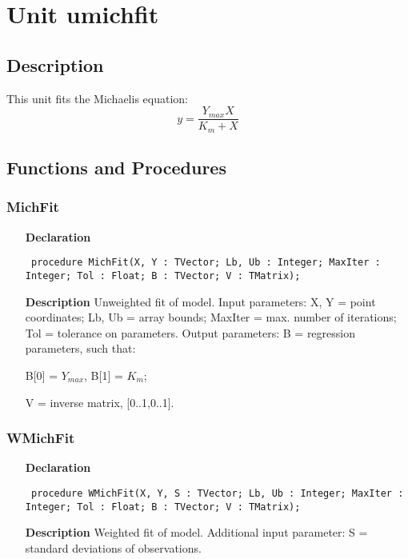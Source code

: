 \documentclass[12pt,a4paper,oneside]{report}
\newcommand{\declarationitem}[1]{\textbf{#1}}
\newcommand{\descriptiontitle}[1]{\textbf{#1}}
\newcommand{\code}[1]{\texttt{#1}}
\begin{document}
\section{Unit umichfit}
\label{umichfit}
\subsection{Description}
This unit fits the Michaelis equation:
$$
y=\frac{Y_{max}X}{K_m+X}
$$
\subsection{Functions and Procedures}
\subsubsection{MichFit}
\label{umichfit-MichFit}
\begin{itemize}\item[\declarationitem{Declaration}\hfill]
	\begin{flushleft}
		\code{
			procedure MichFit(X, Y : TVector; Lb, Ub : Integer; MaxIter : Integer; Tol : Float; B : TVector; V : TMatrix);}
		
	\end{flushleft}
	
	\par
	\item[\descriptiontitle{Description}]
	Unweighted fit of model. Input parameters: X, Y = point coordinates; Lb, Ub = array bounds; MaxIter = max. number of iterations; Tol = tolerance on parameters. Output parameters: B = regression parameters, such that:
	
	B[0] = $Y_{max}$, B[1] = $K_m$;
	
	V = inverse matrix, [0..1,0..1].
	
\end{itemize}
\subsubsection{WMichFit}
\label{umichfit-WMichFit}
\begin{itemize}\item[\declarationitem{Declaration}\hfill]
	\begin{flushleft}
		\code{
			procedure WMichFit(X, Y, S : TVector; Lb, Ub : Integer; MaxIter : Integer; Tol : Float; B : TVector; V : TMatrix);}
		
	\end{flushleft}
	
	\par
	\item[\descriptiontitle{Description}]
	Weighted fit of model. Additional input parameter: S = standard deviations of observations.
	
\end{itemize}
\end{document}
